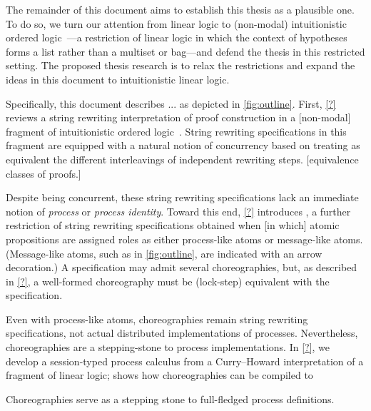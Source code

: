 The remainder of this document aims to establish this thesis as a plausible one.
To do so, we turn our attention from linear logic to (non-modal) intuitionistic ordered logic~\autocites{Lambek:AMM58}{Polakow+Pfenning:MFPS99}---a restriction of linear logic in which the context of hypotheses forms a list rather than a multiset or bag---and defend the thesis in this restricted setting.
The proposed thesis research is to relax the restrictions and expand the ideas in this document to intuitionistic linear logic.

Specifically, this document describes ... as depicted in \cref{fig:outline}.
First, \cref{?} reviews a string rewriting interpretation of proof construction in a [non-modal] fragment of intuitionistic ordered logic~\autocite{Simmons:CMU12}.
String rewriting specifications in this fragment are equipped with a natural notion of concurrency based on treating  as equivalent the different interleavings of independent rewriting steps.
[equivalence classes of proofs.]

Despite being concurrent, these string rewriting specifications lack an immediate notion of \emph{process} or \emph{process identity}.
Toward this end, \cref{?} introduces , a further restriction of string rewriting specifications obtained when [in which] atomic propositions are assigned roles as either process-like atoms or message-like atoms.
(Message-like atoms, such as  in \cref{fig:outline}, are indicated with an arrow decoration.)
A specification may admit several choreographies, but, as described in \cref{?}, a well-formed choreography must be (lock-step) equivalent with the specification.

Even with process-like atoms, choreographies remain string rewriting specifications, not actual distributed implementations of processes.
Nevertheless, choreographies are a stepping-stone to process implementations. 
In \cref{?}, we develop a session-typed process calculus from a Curry--Howard interpretation of a fragment of linear logic; 
 shows how choreographies can be compiled to 

Choreographies serve as a stepping stone to full-fledged process definitions.

